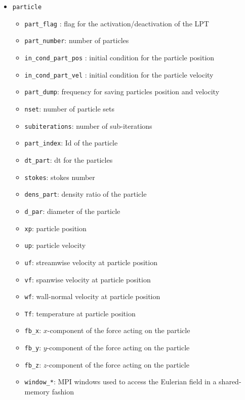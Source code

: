 \begin{itemize}
\item \texttt{particle}
\begin{itemize}
\item \texttt{part\_flag} : flag for the activation/deactivation of the LPT
\item \texttt{part\_number}: number of particles
\item \texttt{in\_cond\_part\_pos} : initial condition for the particle position
\item \texttt{in\_cond\_part\_vel} : initial condition for the particle velocity
\item \texttt{part\_dump}: frequency for saving particles position and velocity
\item \texttt{nset}: number of particle sets
\item \texttt{subiterations}: number of sub-iterations
\item \texttt{part\_index}: Id of the particle 
\item \texttt{dt\_part}: dt for the particles 
\item \texttt{stokes}: stokes number 
\item \texttt{dens\_part}: density ratio of the particle 
\item \texttt{d\_par}: diameter of the particle 
\item \texttt{xp}: particle position 
\item \texttt{up}: particle velocity 
\item \texttt{uf}:  streamwise velocity at particle position
\item \texttt{vf}: spanwise velocity at particle position
\item \texttt{wf}: wall-normal velocity at particle position
\item \texttt{Tf}: temperature at particle position
\item \texttt{fb\_x}: $x$-component of the force acting on the particle
\item \texttt{fb\_y}: $y$-component of the force acting on the particle
\item \texttt{fb\_z}: $z$-component of the force acting on the particle
\item \texttt{window\_*}: MPI windows used to access the Eulerian field in a shared-memory fashion 
\end{itemize}



\end{itemize}
